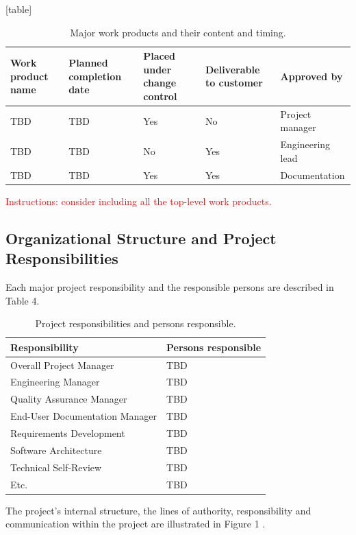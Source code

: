 \documentclass{article}
\begin{document}
[table]
\begin{table}[h]
\centering
\caption{ Major work products and their content and timing.}
\label{tab:work_product_status}
\begin{tabular}{|p{2cm}|p{2cm}|p{2cm}|p{2cm}|p{2.2cm}|}
\hline
\textbf{Work product name} & \textbf{Planned completion date} & \textbf{Placed under change control} & \textbf{Deliverable to customer} & \textbf{Approved by} \\
\hline
TBD & TBD & Yes & No & Project manager  \\
\hline
 TBD & TBD & No & Yes & Engineering lead  \\
\hline
 TBD & TBD & Yes & Yes & Documentation  \\
\hline
\end{tabular}
\end{table}

\textcolor{red}{Instructions: consider including all the top-level work products.}

\subsection{Organizational Structure and Project Responsibilities}
Each major project responsibility and the responsible persons are described in
Table 4.

\begin{table}[h]
\centering
\caption{Project responsibilities and persons responsible.}
\label{tab:project_responsibilities}
\begin{tabular}{|l|l|}
\hline
\textbf{Responsibility} & \textbf{Persons responsible} \\
\hline
Overall Project Manager & TBD \\
\hline
Engineering Manager & TBD \\
\hline
Quality Assurance Manager & TBD \\
\hline
End-User Documentation Manager & TBD \\
\hline
Requirements Development & TBD \\
\hline
Software Architecture & TBD \\
\hline
Technical Self-Review & TBD \\
\hline
Etc. & TBD \\
\hline
\end{tabular}
\end{table}



The project’s internal structure, the lines of authority, responsibility and
communication within the project are illustrated in Figure 1 .
\end{document}
